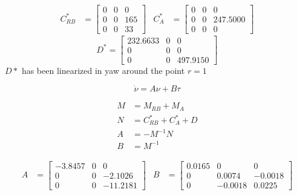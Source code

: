 \documentclass[12pt,a4]{article}
\begin{document}
\begin{align}
	C^*_{RB} & = \left[\begin{array}{ccc} 0 & 0 & 0\\ 0 & 0 & 165\\ 0 & 0 & 33 \end{array}\right]
	         &
	C^*_{A}  & = \left[\begin{array}{ccc} 0 & 0 & 0\\ 0 & 0 & 247.5000\\ 0 & 0 & 0 \end{array}\right]
\end{align}
\begin{equation}
	D^* = \left[\begin{array}{ccc} 232.6633 & 0 & 0\\ 0 & 0 & 0\\ 0 & 0 & 497.9150 \end{array}\right]
\end{equation}
$D*$ has been linearized in yaw around the point $r = 1$

\begin{equation}
	\dot{\nu} = A \nu + B \tau
\end{equation}

\begin{align}
	M & = M_{RB} + M_A           \\
	N & = C^*_{RB} + C^*_{A} + D \\
	A & = -M^{-1}N               \\
	B & = M^{-1}
\end{align}

\begin{align}
	A & = \left[\begin{array}{ccc} -3.8457 & 0 & 0\\ 0 & 0 & -2.1026\\ 0 & 0 & -11.2181 \end{array}\right]
	  &
	B & = \left[\begin{array}{ccc} 0.0165 & 0 & 0\\ 0 & 0.0074 & -0.0018\\ 0 & -0.0018 & 0.0225 \end{array}\right]
\end{align}
\end{document}
